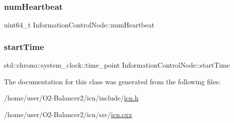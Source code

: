 \mbox{\label{classInformationControlNode_a3530b78061cb560aeba900be9718955c}} 
\subsubsection{\texorpdfstring{num\+Heartbeat}{numHeartbeat}}
{\footnotesize\ttfamily uint64\+\_\+t Information\+Control\+Node\+::num\+Heartbeat\hspace{0.3cm}{\ttfamily [protected]}}

\mbox{\label{classInformationControlNode_a181a99bf688ac3a0702265626c2fa40d}} 
\subsubsection{\texorpdfstring{start\+Time}{startTime}}
{\footnotesize\ttfamily std\+::chrono\+::system\+\_\+clock\+::time\+\_\+point Information\+Control\+Node\+::start\+Time\hspace{0.3cm}{\ttfamily [protected]}}



The documentation for this class was generated from the following files\+:\begin{DoxyCompactItemize}
\item 
/home/user/\+O2-\/\+Balancer2/icn/include/\hyperlink{icn_8h}{icn.\+h}\item 
/home/user/\+O2-\/\+Balancer2/icn/src/\hyperlink{icn_8cxx}{icn.\+cxx}\end{DoxyCompactItemize}
